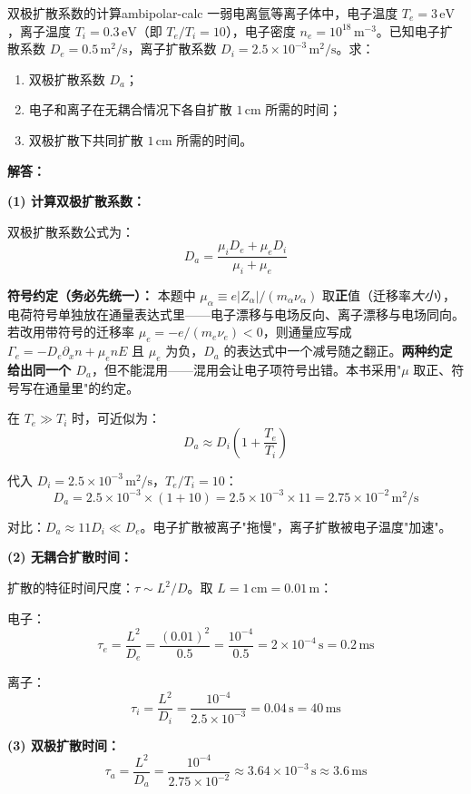 \begin{example}{双极扩散系数的计算}{ambipolar-calc}
一弱电离氩等离子体中，电子温度 $T_e = 3\,\mathrm{eV}$，离子温度 $T_i = 0.3\,\mathrm{eV}$（即 $T_e/T_i = 10$），电子密度 $n_e = 10^{18}\,\mathrm{m}^{-3}$。已知电子扩散系数 $D_e = 0.5\,\mathrm{m}^2/\mathrm{s}$，离子扩散系数 $D_i = 2.5\times 10^{-3}\,\mathrm{m}^2/\mathrm{s}$。求：
\begin{enumerate}[label=(\arabic*)]
\item 双极扩散系数 $D_a$；
\item 电子和离子在无耦合情况下各自扩散 $1\,\mathrm{cm}$ 所需的时间；
\item 双极扩散下共同扩散 $1\,\mathrm{cm}$ 所需的时间。
\end{enumerate}
\tcblower
\textbf{解答：}

\textbf{(1) 计算双极扩散系数：}

双极扩散系数公式为：
\[
D_a = \frac{\mu_i D_e + \mu_e D_i}{\mu_i + \mu_e}
\]

\textbf{符号约定（务必先统一）：} 本题中 $\mu_\alpha\equiv e|Z_\alpha|/(m_\alpha\nu_\alpha)$ 取\textbf{正}值（迁移率\emph{大小}），电荷符号单独放在通量表达式里——电子漂移与电场反向、离子漂移与电场同向。若改用带符号的迁移率 $\mu_e=-e/(m_e\nu_e)<0$，则通量应写成 $\Gamma_e=-D_e\partial_xn+\mu_enE$ 且 $\mu_e$ 为负，$D_a$ 的表达式中一个减号随之翻正。\textbf{两种约定给出同一个 $D_a$}，但不能混用——混用会让电子项符号出错。本书采用"$\mu$ 取正、符号写在通量里"的约定。

在 $T_e \gg T_i$ 时，可近似为：
\[
D_a \approx D_i\left(1 + \frac{T_e}{T_i}\right)
\]

代入 $D_i = 2.5\times 10^{-3}\,\mathrm{m}^2/\mathrm{s}$，$T_e/T_i = 10$：
\[
D_a = 2.5\times 10^{-3}\times (1 + 10) = 2.5\times 10^{-3}\times 11 = 2.75\times 10^{-2}\,\mathrm{m}^2/\mathrm{s}
\]

对比：$D_a \approx 11 D_i \ll D_e$。电子扩散被离子"拖慢"，离子扩散被电子温度"加速"。

\textbf{(2) 无耦合扩散时间：}

扩散的特征时间尺度：$\tau \sim L^2/D$。取 $L = 1\,\mathrm{cm} = 0.01\,\mathrm{m}$：

电子：
\[
\tau_e = \frac{L^2}{D_e} = \frac{(0.01)^2}{0.5} = \frac{10^{-4}}{0.5} = 2\times 10^{-4}\,\mathrm{s} = 0.2\,\mathrm{ms}
\]

离子：
\[
\tau_i = \frac{L^2}{D_i} = \frac{10^{-4}}{2.5\times 10^{-3}} = 0.04\,\mathrm{s} = 40\,\mathrm{ms}
\]

\textbf{(3) 双极扩散时间：}
\[
\tau_a = \frac{L^2}{D_a} = \frac{10^{-4}}{2.75\times 10^{-2}} \approx 3.64\times 10^{-3}\,\mathrm{s} \approx 3.6\,\mathrm{ms}
\]


\end{example}
